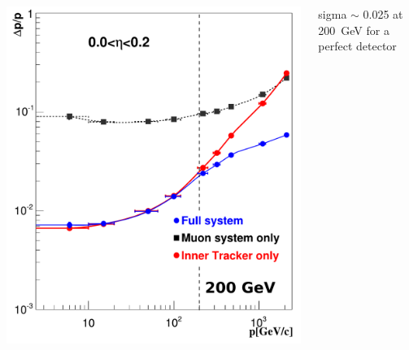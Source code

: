 \documentclass[compress]{beamer}
\begin{document}
\begin{frame}
\begin{columns}
\vspace{0.2 cm}
\includegraphics[width=\linewidth]{Figure_001-005-a.pdf}

sigma $\sim$ 0.025 at 200~GeV for a perfect detector
\end{columns}
\end{frame}

\end{document}
